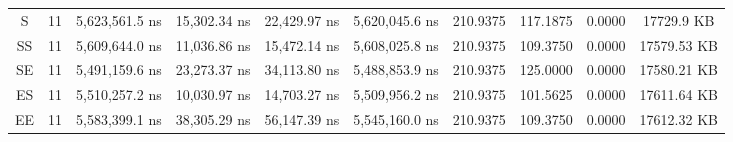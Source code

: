 \begin{sidewaystable}
\begin{tabular}{|c|c|c|c|c|c|c|c|c|c|}
        S      & 11    & 5,623,561.5 ns      & 15,302.34 ns      & 22,429.97 ns        & 5,620,045.6 ns      & 210.9375    & 117.1875  & 0.0000    & 17729.9 KB    \\
        SS     & 11    & 5,609,644.0 ns      & 11,036.86 ns      & 15,472.14 ns        & 5,608,025.8 ns      & 210.9375    & 109.3750  & 0.0000    & 17579.53 KB   \\
        SE     & 11    & 5,491,159.6 ns      & 23,273.37 ns      & 34,113.80 ns        & 5,488,853.9 ns      & 210.9375    & 125.0000  & 0.0000    & 17580.21 KB   \\
        ES     & 11    & 5,510,257.2 ns      & 10,030.97 ns      & 14,703.27 ns        & 5,509,956.2 ns      & 210.9375    & 101.5625  & 0.0000    & 17611.64 KB   \\
        EE     & 11    & 5,583,399.1 ns      & 38,305.29 ns      & 56,147.39 ns        & 5,545,160.0 ns      & 210.9375    & 109.3750  & 0.0000    & 17612.32 KB   \\
        \hline
    \end{tabular}
\end{sidewaystable}
